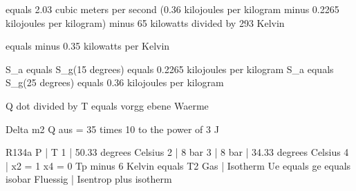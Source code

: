 equals 2.03 cubic meters per second (0.36 kilojoules per kilogram minus 0.2265 kilojoules per kilogram) minus 65 kilowatts divided by 293 Kelvin  

equals minus 0.35 kilowatts per Kelvin  

S_a equals S_g(15 degrees) equals 0.2265 kilojoules per kilogram  
S_a equals S_g(25 degrees) equals 0.36 kilojoules per kilogram  

Q dot divided by T equals vorgg ebene Waerme

Delta m2  
Q aus = 35 times 10 to the power of 3 J

R134a  
P | T  
1 | 50.33 degrees Celsius  
2 | 8 bar  
3 | 8 bar | 34.33 degrees Celsius  
4 |  
x2 = 1  
x4 = 0  
Tp minus 6 Kelvin equals T2  
Gas | Isotherm  
Ue equals ge equals isobar  
Fluessig | Isentrop plus isotherm